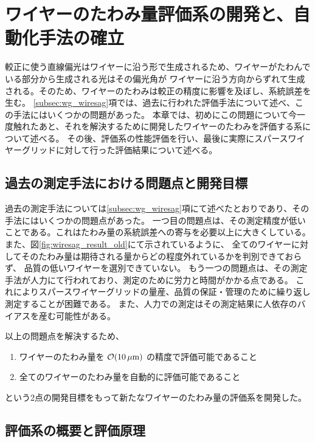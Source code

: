 \documentclass[../../main.tex]{subfiles}
\begin{document}
\chapter{ワイヤーのたわみ量評価系の開発と、自動化手法の確立}
\label{chap:wiresag}
較正に使う直線偏光はワイヤーに沿う形で生成されるため、ワイヤーがたわんでいる部分から生成される光はその偏光角が
ワイヤーに沿う方向からずれて生成される。そのため、ワイヤーのたわみは較正の精度に影響を及ぼし、系統誤差を生む。
\ref{subsec:wg_wiresag}項では、過去に行われた評価手法について述べ、この手法にはいくつかの問題があった。
本章では、初めにこの問題について今一度触れたあと、それを解決するために開発したワイヤーのたわみを評価する系について述べる。
その後、評価系の性能評価を行い、最後に実際にスパースワイヤーグリッドに対して行った評価結果について述べる。

\section{過去の測定手法における問題点と開発目標}

過去の測定手法については\ref{subsec:wg_wiresag}項にて述べたとおりであり、その手法にはいくつかの問題点があった。
一つ目の問題点は、その測定精度が低いことである。これはたわみ量の系統誤差への寄与を必要以上に大きくしている。
また、図\ref{fig:wiresag_result_old}にて示されているように、
全てのワイヤーに対してそのたわみ量は期待される量からどの程度外れているかを判別できておらず、
品質の低いワイヤーを選別できていない。
もう一つの問題点は、その測定手法が人力にて行われており、測定のために労力と時間がかかる点である。
これによりスパースワイヤーグリッドの量産、品質の保証・管理のために繰り返し測定することが困難である。
また、人力での測定はその測定結果に人依存のバイアスを産む可能性がある。

以上の問題点を解決するため、
\begin{enumerate}
    \item ワイヤーのたわみ量を $\order{\SI{10}{\mu m}}$ の精度で評価可能であること
    \item 全てのワイヤーのたわみ量を自動的に評価可能であること
\end{enumerate}
という2点の開発目標をもって新たなワイヤーのたわみ量の評価系を開発した。

\section{評価系の概要と評価原理}
\end{document}
